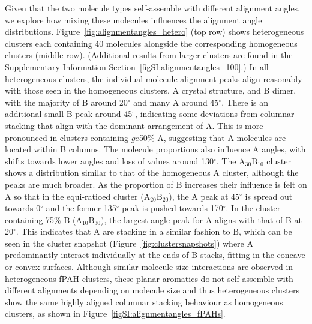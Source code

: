 Given that the two molecule types self-assemble with different alignment angles, we explore how mixing these molecules influences the alignment angle distributions. Figure~\ref{fig:alignmentangles_hetero} (top row) shows heterogeneous clusters each containing 40 molecules alongside the corresponding homogeneous clusters (middle row). (Additional results from larger clusters are found in the Supplementary Information Section~\ref{figSI:alignmentangles_100}.) In all heterogeneous clusters, the individual molecule alignment peaks align reasonably with those seen in the homogeneous clusters, A crystal structure, and B dimer, with the majority of B around 20$^{\circ}$ and many A around 45$^{\circ}$. There is an additional small B peak around 45$^{\circ}$, indicating some deviations from columnar stacking that align with the dominant arrangement of A. This is more pronounced in clusters containing $ge$50\% A, suggesting that A molecules are located within B columns. The molecule proportions also influence A angles, with shifts towards lower angles and loss of values around 130$^{\circ}$. The $\text{A}_{\text{30}}\text{B}_{\text{10}}$ cluster shows a distribution similar to that of the homogeneous A cluster, although the peaks are much broader. As the proportion of B increases their influence is felt on A so that in the equi-ratioed cluster ($\text{A}_{\text{20}}\text{B}_{\text{20}}$), the A peak at 45$^{\circ}$ is spread out towards 0$^{\circ}$ and the former 135$^{\circ}$ peak is pushed towards 170$^{\circ}$. In the cluster containing 75\% B ($\text{A}_{\text{10}}\text{B}_{\text{30}}$), the largest angle peak for A aligns with that of B at 20$^{\circ}$. This indicates that A are stacking in a similar fashion to B, which can be seen in the cluster snapshot (Figure~\ref{fig:clustersnapshots}) where A predominantly interact individually at the ends of B stacks, fitting in the concave or convex surfaces. Although similar molecule size interactions are observed in heterogeneous fPAH clusters, these planar aromatics do not self-assemble with different alignments depending on molecule size and thus heterogeneous clusters show the same highly aligned columnar stacking behaviour as homogeneous clusters, as shown in Figure~\ref{figSI:alignmentangles_fPAHs}.
%
